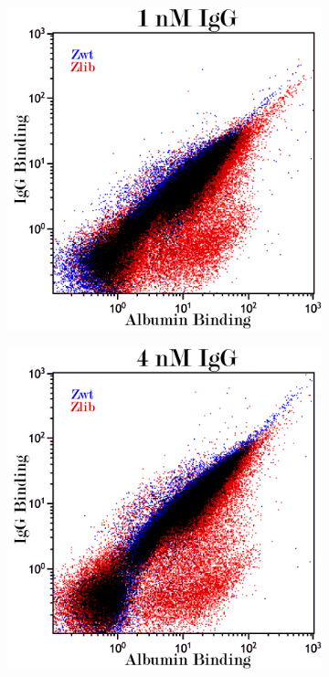 \documentclass{article}
\begin{document}
\begin{multicols}{2}
\begin{figure}[H]
		\begin{subfigure}{0.6\linewidth}
			\includegraphics[width=\linewidth]{images/overlap_1.png}
		\end{subfigure}
	
		\begin{subfigure}{0.6\linewidth}
			\includegraphics[width=\linewidth]{images/overlap_4.png}
		\end{subfigure}
		

\end{figure}
\end{multicols}
\end{document}
